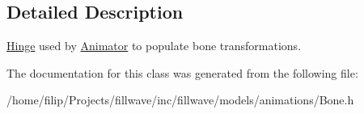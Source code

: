 \subsection{Detailed Description}
\hyperlink{classflw_1_1flf_1_1Hinge}{Hinge} used by \hyperlink{classflw_1_1flf_1_1Animator}{Animator} to populate bone transformations. 

The documentation for this class was generated from the following file\+:\begin{DoxyCompactItemize}
\item 
/home/filip/\+Projects/fillwave/inc/fillwave/models/animations/Bone.\+h\end{DoxyCompactItemize}
